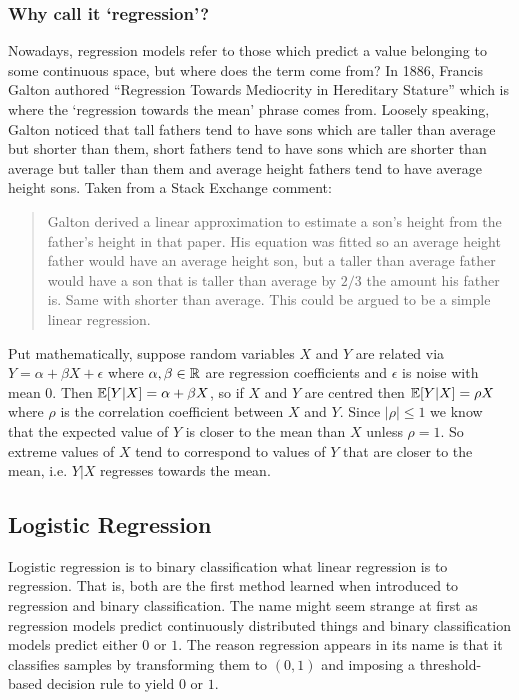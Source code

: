 \documentclass[11pt]{article}
\begin{document}
\subsubsection{Why call it `regression'?}
Nowadays, regression models refer to those which predict a value belonging to some continuous space, but where does the term come from? In 1886, Francis Galton authored ``Regression Towards Mediocrity in Hereditary Stature'' which is where the `regression towards the mean' phrase comes from. Loosely speaking, Galton noticed that tall fathers tend to have sons which are taller than average but shorter than them, short fathers tend to have sons which are shorter than average but taller than them and average height fathers tend to have average height sons. Taken from a Stack Exchange comment:
\begin{quotation}
    Galton derived a linear approximation to estimate a son's height from the father's height in that paper. His equation was fitted so an average height father would have an average height son, but a taller than average father would have a son that is taller than average by $2/3$ the amount his father is. Same with shorter than average. This could be argued to be a simple linear regression.
\end{quotation}
Put mathematically, suppose random variables $X$ and $Y$ are related via $Y=\alpha+\beta X+\epsilon$ where $\alpha,\beta\in\mathbb{R}$ are regression coefficients and $\epsilon$ is noise with mean $0$. Then $\mathbb{E}[Y|X]=\alpha+\beta X$, so if $X$ and $Y$ are centred then $\mathbb{E}[Y|X]=\rho X$ where $\rho$ is the correlation coefficient between $X$ and $Y$. Since $|\rho|\leq1$ we know that the expected value of $Y$ is closer to the mean than $X$ unless $\rho=1$. So extreme values of $X$ tend to correspond to values of $Y$ that are closer to the mean, i.e. $Y|X$ regresses towards the mean.

\subsection{Logistic Regression}

Logistic regression is to binary classification what linear regression is to regression. That is, both are the first method learned when introduced to regression and binary classification. The name might seem strange at first as regression models predict continuously distributed things and binary classification models predict either $0$ or $1$. The reason regression appears in its name is that it classifies samples by transforming them to $(0,1)$ and imposing a threshold-based decision rule to yield $0$ or $1$.
\end{document}
